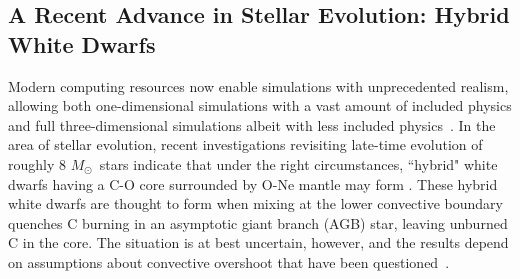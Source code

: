 \documentclass[preprint2]{aastex63}
\newcommand{\Msun}{\ensuremath{M_\odot}}
\begin{document}
%
%
%
%
%
%
%
%
%

\subsection{A Recent Advance in Stellar Evolution: Hybrid White Dwarfs}

Modern computing resources now enable simulations with unprecedented
realism, allowing both one-dimensional simulations with a vast
amount of included physics and full three-dimensional simulations
albeit with less included physics~\citep[][and references therein]{caldertownsley2018}.
In the area of stellar evolution, recent investigations revisiting
late-time evolution of roughly 8 \Msun~stars indicate that under
the right circumstances, ``hybrid" white dwarfs having a C-O core surrounded by O-Ne
mantle may form \citep{siess2009,denissenkovetal2013}. These hybrid
white dwarfs are thought to form when mixing at the lower convective boundary quenches
C burning in an asymptotic giant branch (AGB) star, leaving unburned C
in the core. The situation is at best uncertain, however, and the
results depend on assumptions about convective
overshoot that have been questioned~\citep{chenetal2014,lecoanetetal16,lattanzioetal2017}.
\end{document}
